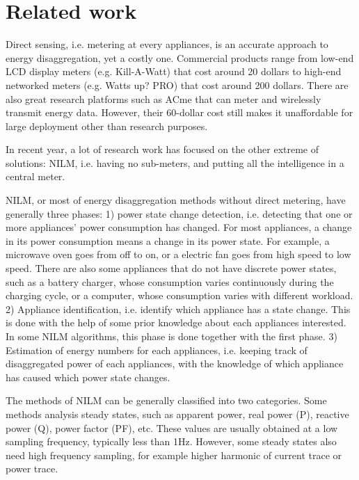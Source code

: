 \chapter{Related work}\label{chap2}

Direct sensing, i.e. metering at every appliances, is an accurate approach to energy disaggregation, yet a costly one. Commercial products range from low-end LCD display meters (e.g. Kill-A-Watt) that cost around 20 dollars to high-end networked meters (e.g. Watts up? PRO) that cost around 200 dollars. There are also great research platforms such as ACme \cite{Jiang2009} that can meter and wirelessly transmit energy data. However, their 60-dollar cost still makes it unaffordable for large deployment other than research purposes. 

In recent year, a lot of research work has focused on the other extreme of solutions: NILM, i.e. having no sub-meters, and putting all the intelligence in a central meter. 

NILM, or most of energy disaggregation methods without direct metering, have generally three phases: 1) power state change detection, i.e. detecting that one or more appliances' power consumption has changed. For most appliances, a change in its power consumption means a change in its power state. For example, a microwave oven goes from off to on, or a electric fan goes from high speed to low speed. There are also some appliances that do not have discrete power states, such as a battery charger, whose consumption varies continuously during the charging cycle, or a computer, whose consumption varies with different workload. 2) Appliance identification, i.e. identify which appliance has a state change. This is done with the help of some prior knowledge about each appliances interested. In some NILM algorithms, this phase is done together with the first phase. 3) Estimation of energy numbers for each appliances, i.e. keeping track of disaggregated power of each appliances, with the knowledge of which appliance has caused which power state changes.

The methods of NILM can be generally classified into two categories. Some methods analysis  steady states, such as apparent power, real power (P), reactive power (Q), power factor (PF), etc. These values are usually obtained at a low sampling frequency, typically less than 1Hz. However, some steady states also need high frequency sampling, for example higher harmonic of current trace or power trace. 

